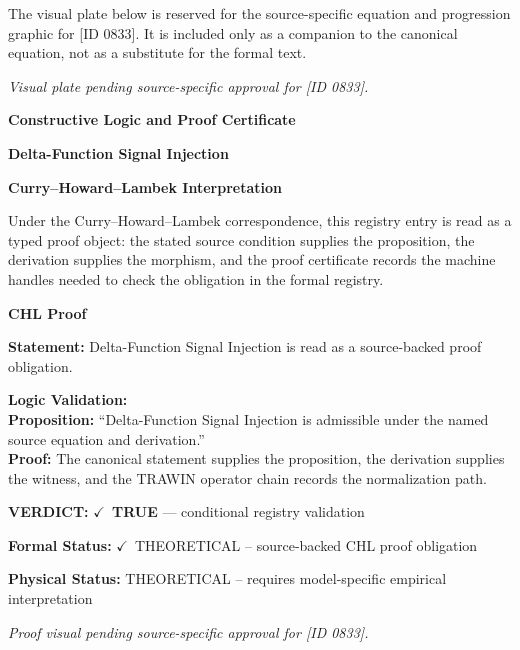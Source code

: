 \begingroup\footnotesize\sloppy
The visual plate below is reserved for the source-specific equation and progression graphic for [ID 0833]. It is included only as a companion to the canonical equation, not as a substitute for the formal text.
\par\endgroup
\begingroup\footnotesize\itshape
Visual plate pending source-specific approval for [ID 0833].
\par\endgroup

\clearpage
\begingroup\tzpsupportsetup
\noindent\textbf{\fontsize{10.8pt}{12.8pt}\selectfont [ID 0833] Constructive Logic and Proof Certificate}\par
\noindent\textbf{\fontsize{10pt}{12pt}\selectfont Delta-Function Signal Injection}\par
\vspace{0.45em}
\begingroup
\footnotesize
\setlength{\parskip}{0.22em}
\setlength{\parindent}{0pt}
\noindent\textbf{Curry--Howard--Lambek Interpretation}\par
Under the Curry--Howard--Lambek correspondence, this registry entry is read as a typed proof
object: the stated source condition supplies the proposition, the derivation supplies the
morphism, and the proof certificate records the machine handles needed to check the obligation
in the formal registry.

\vspace{0.45em}
\noindent\textbf{CHL Proof}\par
\textbf{Statement:} Delta-Function Signal Injection is read as a source-backed proof obligation.

\textbf{Logic Validation:}\\
\textbf{Proposition:} ``Delta-Function Signal Injection is admissible under the named source equation and derivation.''\\
\textbf{Proof:} The canonical statement supplies the proposition, the derivation supplies the witness, and the TRAWIN operator chain records the normalization path.

\textbf{VERDICT:} \ensuremath{\checkmark}\ \textbf{TRUE} --- conditional registry validation

\textbf{Formal Status:} \ensuremath{\checkmark}\ THEORETICAL -- source-backed CHL proof obligation

\textbf{Physical Status:} THEORETICAL -- requires model-specific empirical interpretation
\par\vspace{0.45em}
\par
\vfill
\begingroup\footnotesize\itshape
Proof visual pending source-specific approval for [ID 0833].
\par\endgroup
\vfill
\endgroup
\endgroup
